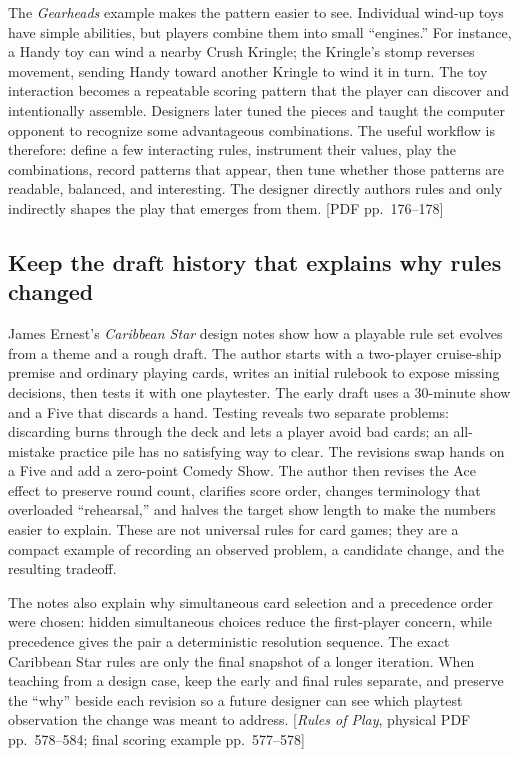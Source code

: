 The \emph{Gearheads} example makes the pattern easier to see. Individual wind-up toys have simple abilities, but players combine them into small ``engines.'' For instance, a Handy toy can wind a nearby Crush Kringle; the Kringle's stomp reverses movement, sending Handy toward another Kringle to wind it in turn. The toy interaction becomes a repeatable scoring pattern that the player can discover and intentionally assemble. Designers later tuned the pieces and taught the computer opponent to recognize some advantageous combinations. The useful workflow is therefore: define a few interacting rules, instrument their values, play the combinations, record patterns that appear, then tune whether those patterns are readable, balanced, and interesting. The designer directly authors rules and only indirectly shapes the play that emerges from them. {[}PDF pp.~176--178{]}

\subsection{Keep the draft history that explains why rules changed}\label{keep-the-draft-history-that-explains-why-rules-changed}

James Ernest's \emph{Caribbean Star} design notes show how a playable rule set evolves from a theme and a rough draft. The author starts with a two-player cruise-ship premise and ordinary playing cards, writes an initial rulebook to expose missing decisions, then tests it with one playtester. The early draft uses a 30-minute show and a Five that discards a hand. Testing reveals two separate problems: discarding burns through the deck and lets a player avoid bad cards; an all-mistake practice pile has no satisfying way to clear. The revisions swap hands on a Five and add a zero-point Comedy Show. The author then revises the Ace effect to preserve round count, clarifies score order, changes terminology that overloaded ``rehearsal,'' and halves the target show length to make the numbers easier to explain. These are not universal rules for card games; they are a compact example of recording an observed problem, a candidate change, and the resulting tradeoff.

The notes also explain why simultaneous card selection and a precedence order were chosen: hidden simultaneous choices reduce the first-player concern, while precedence gives the pair a deterministic resolution sequence. The exact Caribbean Star rules are only the final snapshot of a longer iteration. When teaching from a design case, keep the early and final rules separate, and preserve the ``why'' beside each revision so a future designer can see which playtest observation the change was meant to address. {[}\emph{Rules of Play}, physical PDF pp.~578--584; final scoring example pp.~577--578{]}

